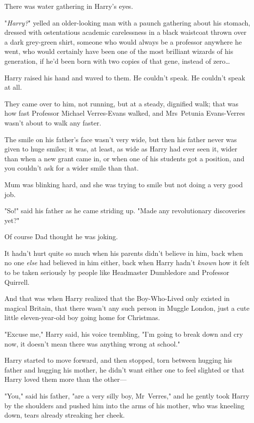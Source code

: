 There was water gathering in Harry's eyes.

"\emph{Harry?}" yelled an older-looking man with a paunch gathering about his
stomach, dressed with ostentatious academic carelessness in a black waistcoat thrown
over a dark grey-green shirt, someone who would always be a professor anywhere
he went, who would certainly have been one of the most brilliant wizards of his
generation, if he'd been born with two copies of that gene, instead of
zero…

Harry raised his hand and waved to them. He couldn't speak. He couldn't speak
at all.

They came over to him, not running, but at a steady, dignified walk; that was
how fast Professor Michael Verres-Evans walked, and Mrs~Petunia Evans-Verres
wasn't about to walk any faster.

The smile on his father's face wasn't very wide, but then his father never was
given to huge smiles; it was, at least, as wide as Harry had ever seen it,
wider than when a new grant came in, or when one of his students got a
position, and you couldn't ask for a wider smile than that.

Mum was blinking hard, and she was trying to smile but not doing a very good
job.

"So!" said his father as he came striding up. "Made any revolutionary
discoveries yet?"

Of course Dad thought he was joking.

It hadn't hurt quite so much when his parents didn't believe in him, back when
no one \emph{else} had believed in him either, back when Harry hadn't
\emph{known} how it felt to be taken seriously by people like Headmaster
Dumbledore and Professor Quirrell.

And that was when Harry realized that the Boy-Who-Lived only existed in magical
Britain, that there wasn't any such person in Muggle London, just a cute little
eleven-year-old boy going home for Christmas.

"Excuse me," Harry said, his voice trembling, "I'm going to break down and cry
now, it doesn't mean there was anything wrong at school."

Harry started to move forward, and then stopped, torn between hugging his
father and hugging his mother, he didn't want either one to feel slighted or
that Harry loved them more than the other—

"You," said his father, "are a very silly boy, Mr~Verres," and he gently took
Harry by the shoulders and pushed him into the arms of his mother, who was
kneeling down, tears already streaking her cheek.

